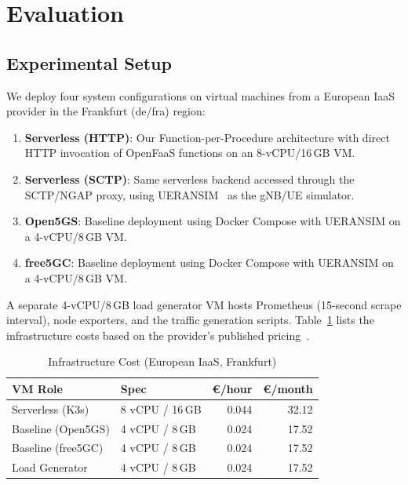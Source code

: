 \documentclass[conference]{IEEEtran}
\begin{document}
\section{Evaluation}
\label{sec:evaluation}

\subsection{Experimental Setup}

We deploy four system configurations on virtual machines from a European IaaS provider in the Frankfurt (de/fra) region:

\begin{enumerate}
    \item \textbf{Serverless (HTTP)}: Our Function-per-Procedure architecture with direct HTTP invocation of OpenFaaS functions on an 8-vCPU/16\,GB VM.
    \item \textbf{Serverless (SCTP)}: Same serverless backend accessed through the SCTP/NGAP proxy, using UERANSIM~\cite{ueransim} as the gNB/UE simulator.
    \item \textbf{Open5GS}: Baseline deployment using Docker Compose with UERANSIM on a 4-vCPU/8\,GB VM.
    \item \textbf{free5GC}: Baseline deployment using Docker Compose with UERANSIM on a 4-vCPU/8\,GB VM.
\end{enumerate}

A separate 4-vCPU/8\,GB load generator VM hosts Prometheus (15-second scrape interval), node exporters, and the traffic generation scripts. Table~\ref{tab:infra-cost} lists the infrastructure costs based on the provider's published pricing~\cite{cloud-pricing}.

\begin{table}[t]
\centering
\caption{Infrastructure Cost (European IaaS, Frankfurt)}
\label{tab:infra-cost}
\small
\begin{tabular}{@{}llrr@{}}
\toprule
\textbf{VM Role} & \textbf{Spec} & \textbf{\euro/hour} & \textbf{\euro/month} \\
\midrule
Serverless (K3s) & 8 vCPU / 16\,GB & 0.044 & 32.12 \\
Baseline (Open5GS) & 4 vCPU / 8\,GB & 0.024 & 17.52 \\
Baseline (free5GC) & 4 vCPU / 8\,GB & 0.024 & 17.52 \\
Load Generator & 4 vCPU / 8\,GB & 0.024 & 17.52 \\
\bottomrule
\end{tabular}
\end{table}
\end{document}
